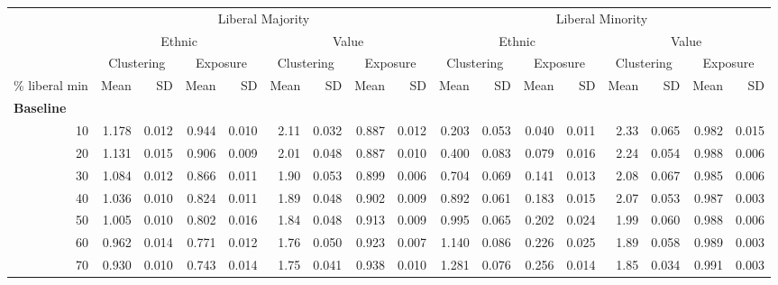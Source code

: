\documentclass[
]{article}
\begin{document}
\begin{table}[H]
\begin{table}
{\begin{tabular}{r|r|r|r|r|r|r|r|r|r|r|r|r|r|r|r|r}
\hline
\multicolumn{1}{c|}{ } & \multicolumn{8}{c|}{Liberal Majority} & \multicolumn{8}{c}{Liberal Minority} \\
\cline{2-9} \cline{10-17}
\multicolumn{1}{c|}{ } & \multicolumn{4}{c|}{Ethnic} & \multicolumn{4}{c|}{Value} & \multicolumn{4}{c|}{Ethnic} & \multicolumn{4}{c}{Value} \\
\cline{2-5} \cline{6-9} \cline{10-13} \cline{14-17}
\multicolumn{1}{c|}{ } & \multicolumn{2}{c|}{Clustering} & \multicolumn{2}{c|}{Exposure} & \multicolumn{2}{c|}{Clustering} & \multicolumn{2}{c|}{Exposure} & \multicolumn{2}{c|}{Clustering} & \multicolumn{2}{c|}{Exposure} & \multicolumn{2}{c|}{Clustering} & \multicolumn{2}{c}{Exposure} \\
\cline{2-3} \cline{4-5} \cline{6-7} \cline{8-9} \cline{10-11} \cline{12-13} \cline{14-15} \cline{16-17}
\% liberal min & Mean & SD & Mean & SD & Mean & SD & Mean & SD & Mean & SD & Mean & SD & Mean & SD & Mean & SD\\
\hline
\multicolumn{17}{l}{\textbf{Baseline}}\\
\hline
\hspace{1em}10 & 1.178 & 0.012 & 0.944 & 0.010 & 2.11 & 0.032 & 0.887 & 0.012 & 0.203 & 0.053 & 0.040 & 0.011 & 2.33 & 0.065 & 0.982 & 0.015\\
\hline
\hspace{1em}20 & 1.131 & 0.015 & 0.906 & 0.009 & 2.01 & 0.048 & 0.887 & 0.010 & 0.400 & 0.083 & 0.079 & 0.016 & 2.24 & 0.054 & 0.988 & 0.006\\
\hline
\hspace{1em}30 & 1.084 & 0.012 & 0.866 & 0.011 & 1.90 & 0.053 & 0.899 & 0.006 & 0.704 & 0.069 & 0.141 & 0.013 & 2.08 & 0.067 & 0.985 & 0.006\\
\hline
\hspace{1em}40 & 1.036 & 0.010 & 0.824 & 0.011 & 1.89 & 0.048 & 0.902 & 0.009 & 0.892 & 0.061 & 0.183 & 0.015 & 2.07 & 0.053 & 0.987 & 0.003\\
\hline
\hspace{1em}50 & 1.005 & 0.010 & 0.802 & 0.016 & 1.84 & 0.048 & 0.913 & 0.009 & 0.995 & 0.065 & 0.202 & 0.024 & 1.99 & 0.060 & 0.988 & 0.006\\
\hline
\hspace{1em}60 & 0.962 & 0.014 & 0.771 & 0.012 & 1.76 & 0.050 & 0.923 & 0.007 & 1.140 & 0.086 & 0.226 & 0.025 & 1.89 & 0.058 & 0.989 & 0.003\\
\hline
\hspace{1em}70 & 0.930 & 0.010 & 0.743 & 0.014 & 1.75 & 0.041 & 0.938 & 0.010 & 1.281 & 0.076 & 0.256 & 0.014 & 1.85 & 0.034 & 0.991 & 0.003\\

\end{tabular}}
\end{table}
\end{table}
\end{document}
